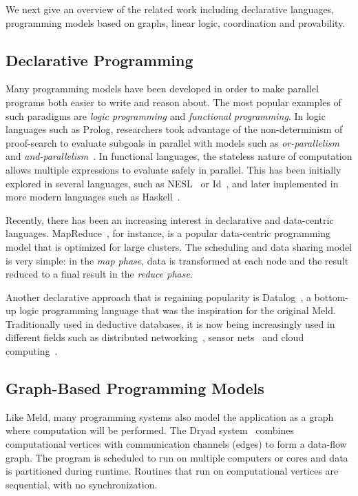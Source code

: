We next give an overview of the related work including declarative languages, programming models
based on graphs, linear logic, coordination and provability.

\subsection{Declarative Programming}

Many programming models have been developed in order to make parallel programs both easier to write and reason about. The most popular examples of such paradigms are \emph{logic programming} and \emph{functional programming}.
In logic languages such as Prolog, researchers took advantage of the non-determinism of proof-search to evaluate subgoals
in parallel with models such as \emph{or-parallelism} and \emph{and-parallelism}~\cite{Gupta:2001:PEP:504083.504085}.
In functional languages, the stateless nature of computation allows multiple expressions to evaluate safely in parallel.
This has been initially explored in several languages, such as NESL~\cite{Blelloch:1996:PPA:227234.227246} or Id~\cite{Nikhil93anoverview}, and later implemented in more modern languages such as Haskell~\cite{Chakravarty07dataparallel}.

Recently, there has been an increasing interest in declarative and data-centric languages.
MapReduce~\cite{Dean:2008:MSD:1327452.1327492}, for instance, is a popular data-centric programming
model that is optimized for large clusters. The scheduling and data sharing model is very simple:
in the \emph{map phase}, data is transformed at each node and the result reduced to a final
result in the \emph{reduce phase}.

Another declarative approach that is regaining popularity is Datalog~\cite{Ullman:1990:PDK:533142}, a
bottom-up logic programming language that was the inspiration for the original Meld.
Traditionally used in deductive databases, it is now being increasingly used in different fields
such as distributed networking~\cite{Loo-condie-garofalakis-p2}, sensor
nets~\cite{Chu:2007:DID:1322263.1322281} and cloud computing~\cite{alvaro:boom}.

\subsection{Graph-Based Programming Models}

Like Meld, many programming systems also model the application as a graph where computation will be performed.
The Dryad system~\cite{Isard:2007:DDD:1272996.1273005} combines computational vertices
with communication channels (edges) to form a data-flow graph. The program is scheduled to
run on multiple computers or cores and data is partitioned during runtime. Routines that run on computational vertices
are sequential, with no synchronization.

